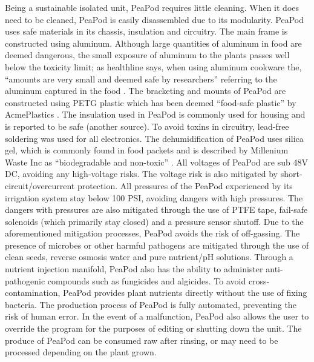 \documentclass{report}
\begin{document}

Being a sustainable isolated unit, PeaPod requires little cleaning. When it does need to be cleaned, PeaPod is easily disassembled due to its modularity. 
PeaPod uses safe materials in its chassis, insulation and circuitry. 
The main frame is constructed using aluminum. Although large quantities of aluminum in food are deemed dangerous, the small exposure of aluminum to the plants passes well below the toxicity limit; as healthline says, when using aluminum cookware the, “amounts are very small and deemed safe by researchers” referring to the aluminum captured in the food %
. 
The bracketing and mounts of PeaPod are constructed using PETG plastic which has been deemed “food-safe plastic” by AcmePlastics %
. The insulation used in PeaPod is commonly used for housing and is reported to be safe (another source). 
To avoid toxins in circuitry, lead-free soldering was used for all electronics. The dehumidification of PeaPod uses silica gel, which is commonly found in food packets and is described by Millenium Waste Inc as “biodegradable and non-toxic” %
. 
All voltages of PeaPod are sub 48V DC, avoiding any high-voltage risks. The voltage risk is also mitigated by short-circuit/overcurrent protection. 
All pressures of the PeaPod experienced by its irrigation system stay below 100 PSI, avoiding dangers with high pressures. The dangers with pressures are also mitigated through the use of PTFE tape, fail-safe solenoids (which primarily stay closed) and a pressure sensor shutoff. 
Due to the aforementioned mitigation processes, PeaPod avoids the risk of off-gassing. The presence of microbes or other harmful pathogens are mitigated through the use of clean seeds, reverse osmosis water and pure nutrient/pH solutions. Through a nutrient injection manifold, PeaPod also has the ability to administer anti-pathogenic compounds such as fungicides and algicides. 
To avoid cross-contamination, PeaPod provides plant nutrients directly without the use of fixing bacteria. The production process of PeaPod is fully automated, preventing the risk of human error. 
In the event of a malfunction, PeaPod also allows the user to override the program for the purposes of editing or shutting down the unit. The produce of PeaPod can be consumed raw after rinsing, or may need to be processed depending on the plant grown. 
\end{document}

